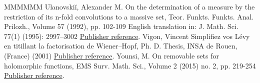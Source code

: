 \begin{thebibliography}{MMMMMM}
 Ulanovskiĭ, Alexander M. On the determination of a measure by the restriction of its n-fold convolutions to a massive set, Teor. Funkts. Funkts. Anal. Prilozh., Volume 57 (1992), pp. 102-109 English translation in: J. Math. Sci. 77(1) (1995): 2997–3002 \href{https://ahl.centre-mersenne.org/item/AHL_2020__3__1389_0/#bib:u94}{Publisher reference}.
 Vigon, Vincent Simplifiez vos Lévy en titillant la factorisation de Wiener–Hopf, Ph. D. Thesis, INSA de Rouen, (France) (2001) \href{https://ahl.centre-mersenne.org/item/AHL_2020__3__1389_0/#bib:v02}{Publisher reference}.
 Younsi, M. On removable sets for holomorphic functions, EMS Surv. Math. Sci., Volume 2 (2015) no. 2, pp. 219-254 \href{https://ahl.centre-mersenne.org/item/AHL_2020__3__1389_0/#bib:y15}{Publisher reference}.
\end{thebibliography}

